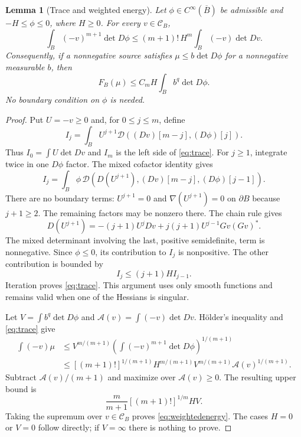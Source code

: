\documentclass[11pt]{article}
\newtheorem{lemma}{Lemma}
\numberwithin{equation}{section}
\begin{document}
\begin{lemma}[Trace and weighted energy]\label{lem:weightedenergy}
Let $\phi\in C^\infty(\overline B)$ be admissible and
$-H\le\phi\le0$, where $H\ge0$.
For every $v\in\mathcal C_B$,
\begin{equation}\label{eq:trace}
 \int_B(-v)^{m+1}\det D\phi
 \le (m+1)!\,H^m\int_B(-v)\det Dv.
\end{equation}
Consequently, if a nonnegative source satisfies
$\mu\le b\det D\phi$ for a nonnegative measurable $b$, then
\begin{equation}\label{eq:weightedenergy}
 F_B(\mu)\le C_mH\int_B b^q\det D\phi.
\end{equation}
No boundary condition on $\phi$ is needed.
\end{lemma}
\begin{proof}
Put $U=-v\ge0$ and, for $0\le j\le m$, define
\[
 I_j=\int_B U^{j+1}
           \mathcal D((Dv)[m-j],(D\phi)[j]).
\]
Thus $I_0=\int U\det Dv$ and $I_m$ is the left side of
\eqref{eq:trace}. For $j\ge1$, integrate twice in one $D\phi$
factor. The mixed cofactor identity gives
\[
 I_j=\int_B\phi\,
 \mathcal D(D(U^{j+1}),(Dv)[m-j],(D\phi)[j-1]).
\]
There are no boundary terms: $U^{j+1}=0$ and
$\nabla(U^{j+1})=0$ on $\partial B$ because $j+1\ge2$.
The remaining factors may be nonzero there.
The chain rule gives
\[
 D(U^{j+1})=-(j+1)U^jDv
             +j(j+1)U^{j-1}Gv(Gv)^*.
\]
The mixed determinant involving the last, positive semidefinite,
term is nonnegative. Since $\phi\le0$, its contribution to $I_j$
is nonpositive. The other contribution is bounded by
\[
 I_j\le (j+1)H I_{j-1}.
\]
Iteration proves \eqref{eq:trace}. This argument uses only smooth
functions and remains valid when one of the Hessians is singular.

Let $V=\int b^q\det D\phi$ and
$\mathcal A(v)=\int(-v)\det Dv$. H\"older's inequality and
\eqref{eq:trace} give
\begin{align*}
 \int(-v)\mu
 &\le V^{m/(m+1)}
      \left(\int(-v)^{m+1}\det D\phi\right)^{1/(m+1)}\\
 &\le [(m+1)!]^{1/(m+1)}
          H^{m/(m+1)}V^{m/(m+1)}
          \mathcal A(v)^{1/(m+1)}.
\end{align*}
Subtract $\mathcal A(v)/(m+1)$ and maximize over
$\mathcal A(v)\ge0$. The resulting upper bound is
\[
 \frac{m}{m+1}[(m+1)!]^{1/m}HV.
\]
Taking the supremum over $v\in\mathcal C_B$ proves
\eqref{eq:weightedenergy}. The cases $H=0$ or $V=0$ follow directly;
if $V=\infty$ there is nothing to prove.
\end{proof}
\end{document}
